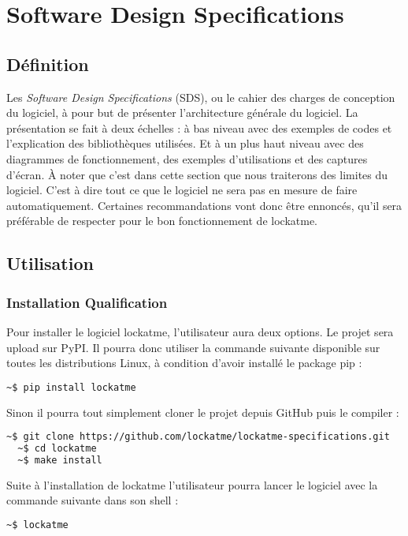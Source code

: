 \chapter{Software Design Specifications}
\newpage
\section{Définition}
Les \emph{Software Design Specifications} (SDS), ou le cahier des charges de conception
du logiciel, à pour but de présenter l'architecture générale du logiciel.
La présentation se fait à deux échelles : à bas niveau avec des exemples de codes et
l'explication des bibliothèques utilisées. Et à un plus haut niveau avec des diagrammes
de fonctionnement, des exemples d'utilisations et des captures d'écran. À noter
que c'est dans cette section que nous traiterons des limites du logiciel. C'est
à dire tout ce que le logiciel ne sera pas en mesure de faire automatiquement.
Certaines recommandations vont donc être ennoncés, qu'il sera préférable de
respecter pour le bon fonctionnement de lockatme.
\section{Utilisation}
  \subsection{Installation Qualification}
Pour installer le logiciel lockatme, l'utilisateur aura deux options. Le
projet sera upload sur PyPI. Il pourra donc utiliser la commande
suivante disponible sur toutes les distributions Linux, à condition d'avoir
installé le package pip :
\begin{lstlisting}[language=bash]
  ~$ pip install lockatme
\end{lstlisting}
Sinon il pourra tout simplement cloner le projet depuis GitHub puis le compiler :
\begin{lstlisting}[language=bash]
  ~$ git clone https://github.com/lockatme/lockatme-specifications.git
  ~$ cd lockatme
  ~$ make install
\end{lstlisting}
Suite à l'installation de lockatme l'utilisateur pourra lancer le logiciel
avec la commande suivante dans son shell :
\begin{lstlisting}[language=bash]
  ~$ lockatme
\end{lstlisting}

